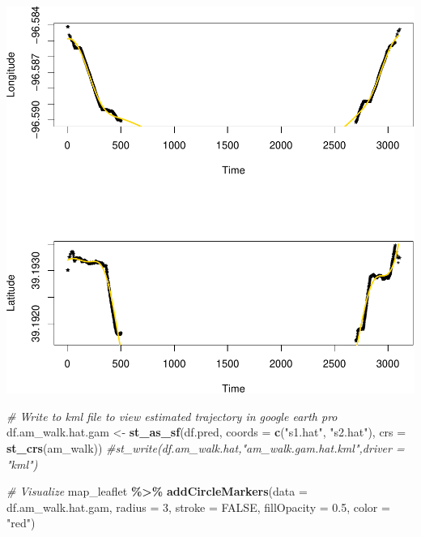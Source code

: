 \documentclass[
]{book}
\newenvironment{Shaded}{\begin{snugshade}}{\end{snugshade}}
\newcommand{\AttributeTok}[1]{\textcolor[rgb]{0.13,0.29,0.53}{#1}}
\newcommand{\CommentTok}[1]{\textcolor[rgb]{0.56,0.35,0.01}{\textit{#1}}}
\newcommand{\ConstantTok}[1]{\textcolor[rgb]{0.56,0.35,0.01}{#1}}
\newcommand{\DecValTok}[1]{\textcolor[rgb]{0.00,0.00,0.81}{#1}}
\newcommand{\FloatTok}[1]{\textcolor[rgb]{0.00,0.00,0.81}{#1}}
\newcommand{\FunctionTok}[1]{\textcolor[rgb]{0.13,0.29,0.53}{\textbf{#1}}}
\newcommand{\NormalTok}[1]{#1}
\newcommand{\OtherTok}[1]{\textcolor[rgb]{0.56,0.35,0.01}{#1}}
\newcommand{\SpecialCharTok}[1]{\textcolor[rgb]{0.81,0.36,0.00}{\textbf{#1}}}
\newcommand{\StringTok}[1]{\textcolor[rgb]{0.31,0.60,0.02}{#1}}
\begin{document}
\includegraphics{_main_files/figure-latex/unnamed-chunk-8-1.pdf}

\begin{Shaded}
\begin{Highlighting}[]
\CommentTok{\# Write to kml file to view estimated trajectory in google earth pro}
\NormalTok{df.am\_walk.hat.gam }\OtherTok{\textless{}{-}} \FunctionTok{st\_as\_sf}\NormalTok{(df.pred, }\AttributeTok{coords =} \FunctionTok{c}\NormalTok{(}\StringTok{"s1.hat"}\NormalTok{, }\StringTok{"s2.hat"}\NormalTok{), }
                           \AttributeTok{crs =} \FunctionTok{st\_crs}\NormalTok{(am\_walk))}
\CommentTok{\#st\_write(df.am\_walk.hat,"am\_walk.gam.hat.kml",driver = "kml")}

\CommentTok{\# Visualize}
\NormalTok{map\_leaflet }\SpecialCharTok{\%\textgreater{}\%}
  \FunctionTok{addCircleMarkers}\NormalTok{(}\AttributeTok{data =}\NormalTok{ df.am\_walk.hat.gam,}
                   \AttributeTok{radius =} \DecValTok{3}\NormalTok{, }\AttributeTok{stroke =} \ConstantTok{FALSE}\NormalTok{, }\AttributeTok{fillOpacity =} \FloatTok{0.5}\NormalTok{,}
                   \AttributeTok{color =} \StringTok{"red"}\NormalTok{)}
\end{Highlighting}
\end{Shaded}
\end{document}
